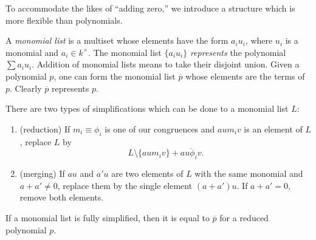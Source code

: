 To accommodate the likes of ``adding zero,'' we introduce a structure which is more flexible than polynomials.
\begin{defn}
	A \emph{monomial list} is a multiset whose elements have the form $a_i u_i$, where $u_i$ is a monomial and $a_i \in k^\times$.	The monomial list $\{a_i u_i\}$ \emph{represents} the polynomial $\sum a_i u_i$. Addition of monomial lists means to take their disjoint union. Given a polynomial $p$, one can form the monomial list $\overline{p}$ whose elements are the terms of $p$. Clearly $\overline{p}$ represents $p$.
\end{defn}
There are two types of simplifications which can be done to a monomial list $L$:
\begin{enumerate}
	\item (reduction) If $m_i \equiv \phi_i$ is one of our congruences and $aum_iv$ is an element of $L$, replace $L$ by
	\[
		L\setminus \{aum_i v\} + \overline{au\phi_i v}.
	\]
	\item (merging) If $au$ and $a'u$ are two elements of $L$ with the same monomial and $a+a' \neq 0$, replace them by the single element $(a+a')u$. If $a+a' = 0$, remove both elements.
\end{enumerate}
If a monomial list is fully simplified, then it is equal to $\overline{p}$ for a reduced polynomial $p$.

